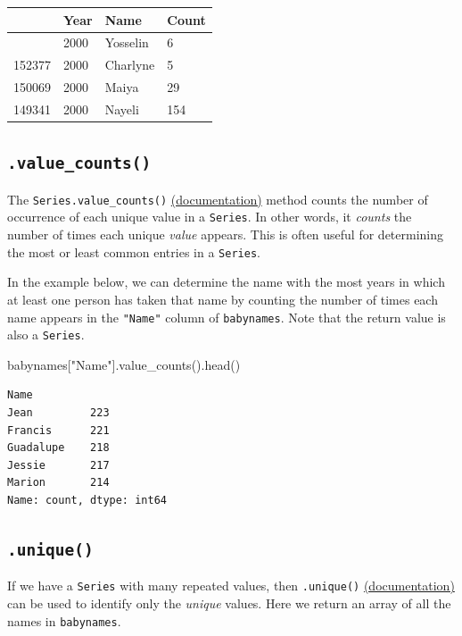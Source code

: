 \documentclass[
  letterpaper,
  DIV=11,
  numbers=noendperiod]{scrreprt}
\newenvironment{Shaded}{\begin{snugshade}}{\end{snugshade}}
\newcommand{\NormalTok}[1]{\textcolor[rgb]{0.00,0.23,0.31}{#1}}
\newcommand{\StringTok}[1]{\textcolor[rgb]{0.13,0.47,0.30}{#1}}
\begin{document}
\begin{longtable}[]{@{}llll@{}}
\toprule\noalign{}
& Year & Name & Count \\
\midrule\noalign{}
\endhead
\bottomrule\noalign{}
\endlastfoot
152276 & 2000 & Yosselin & 6 \\
152377 & 2000 & Charlyne & 5 \\
150069 & 2000 & Maiya & 29 \\
149341 & 2000 & Nayeli & 154 \\
\end{longtable}

\subsection{\texorpdfstring{\texttt{.value\_counts()}}{.value\_counts()}}\label{value_counts}

The \texttt{Series.value\_counts()}
\href{https://pandas.pydata.org/docs/reference/api/pandas.Series.value_counts.html}{(documentation)}
method counts the number of occurrence of each unique value in a
\texttt{Series}. In other words, it \emph{counts} the number of times
each unique \emph{value} appears. This is often useful for determining
the most or least common entries in a \texttt{Series}.

In the example below, we can determine the name with the most years in
which at least one person has taken that name by counting the number of
times each name appears in the \texttt{"Name"} column of
\texttt{babynames}. Note that the return value is also a
\texttt{Series}.

\begin{Shaded}
\begin{Highlighting}[]
\NormalTok{babynames[}\StringTok{"Name"}\NormalTok{].value\_counts().head()}
\end{Highlighting}
\end{Shaded}

\begin{verbatim}
Name
Jean         223
Francis      221
Guadalupe    218
Jessie       217
Marion       214
Name: count, dtype: int64
\end{verbatim}

\subsection{\texorpdfstring{\texttt{.unique()}}{.unique()}}\label{unique}

If we have a \texttt{Series} with many repeated values, then
\texttt{.unique()}
\href{https://pandas.pydata.org/docs/reference/api/pandas.unique.html}{(documentation)}
can be used to identify only the \emph{unique} values. Here we return an
array of all the names in \texttt{babynames}.
\end{document}

